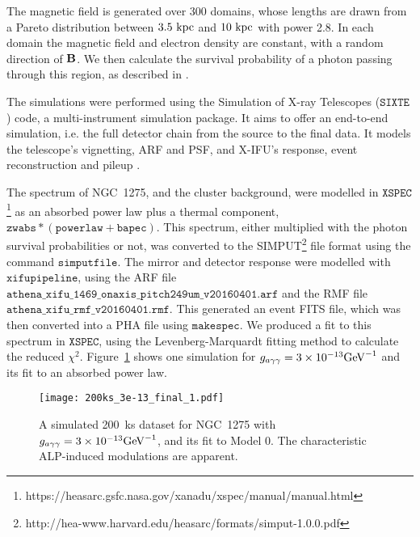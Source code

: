 \documentclass[fleqn,usenatbib,useAMS]{mnras}
\begin{document}
The magnetic field is generated over 300 domains, whose lengths are drawn from a Pareto distribution between $3.5~\rm{kpc}$ and $10~\rm{kpc}$ with power 2.8. In each domain the magnetic field and electron density are constant, with a random direction of ${\bf B}$. We then
calculate the survival probability of a photon passing through this region, as described in \citep{1312.3947}.

The simulations were performed using the Simulation of X-ray Telescopes ($\mathtt{SIXTE}$) code, a multi-instrument simulation package. It aims to offer an end-to-end simulation, i.e. the full detector chain from the source to the final data. It models the telescope's vignetting, ARF and PSF, and X-IFU's response, event reconstruction and pileup \citep{2014SPIE.9144E..5XW}.

The spectrum of NGC~1275, and the cluster background, were modelled in $\mathtt{XSPEC}$\footnote{https://heasarc.gsfc.nasa.gov/xanadu/xspec/manual/manual.html} as an absorbed power law plus a thermal component, $\mathtt{zwabs*(powerlaw + bapec)}$. This spectrum, either multiplied with the photon survival probabilities or not, was converted to the SIMPUT\footnote{http://hea-www.harvard.edu/heasarc/formats/simput-1.0.0.pdf} file format using the command $\mathtt{simputfile}$. The mirror and detector response were modelled with $\mathtt{xifupipeline}$, using the ARF file $\mathtt{athena\_xifu\_1469\_onaxis\_pitch249um\_v20160401.arf}$ and the RMF file $\mathtt{athena\_xifu\_rmf\_v20160401.rmf}$. This generated an event FITS file, which was then converted into a PHA file using $\mathtt{makespec}$. We produced a fit to this spectrum in $\mathtt{XSPEC}$, using the Levenberg-Marquardt fitting method to calculate the reduced $\chi^2$. Figure~\ref{spectrum} shows one simulation for ${g_{a \gamma \gamma} = 3 \times 10^{-13} {\rm GeV}^{-1}}$ and its fit to an absorbed power law.

\begin{figure}
\texttt{[image: 200ks\_3e-13\_final\_1.pdf]}
\caption{A simulated 200~ks dataset for NGC~1275 with ${g_{a \gamma \gamma} = 3 \times 10^{-13} \rm{GeV}^{-1}}$, and its fit to Model 0. The characteristic ALP-induced modulations are apparent.}
\label{spectrum}
\end{figure}
\end{document}
